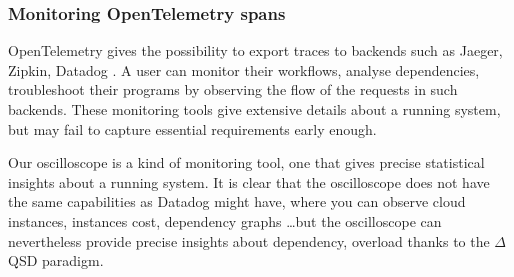     \subsubsection{Monitoring OpenTelemetry spans}
            OpenTelemetry gives the possibility to export traces to backends such as Jaeger, Zipkin, Datadog \cite{otel-exp}. A user can monitor their workflows, analyse dependencies, troubleshoot their programs by observing the flow of the requests in such backends\cite{jg}. These monitoring tools give extensive details about a running system, but may fail to capture essential requirements early enough.
        
        Our oscilloscope is a kind of monitoring tool, one that gives precise statistical insights about a running system. It is clear that the oscilloscope does not have the same capabilities as Datadog \cite{datadog} might have, where you can observe cloud instances, instances cost, dependency graphs \dots but the oscilloscope can nevertheless provide precise insights about dependency, overload thanks to the $\Delta$QSD paradigm. 

